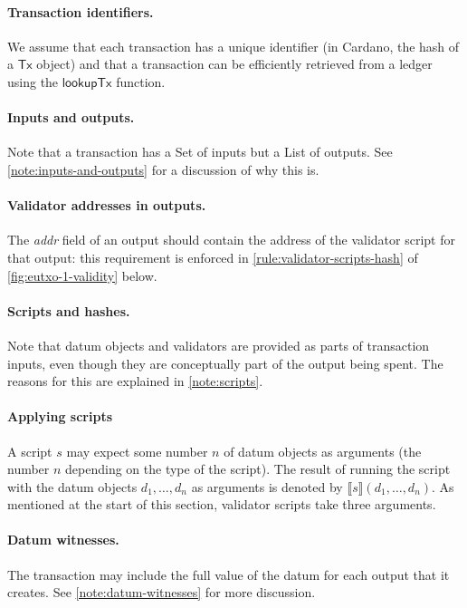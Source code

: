 \documentclass[a4paper]{article}
\newcounter{note}
\newcommand{\msf}[1]{\ensuremath{\mathsf{#1}}}
\newcommand{\lookupTx}{\msf{lookupTx}}
\newcommand{\eutxotx}{\msf{Tx}}
\newcommand{\applyScript}[1]{\ensuremath{\llbracket#1\rrbracket}}
\begin{document}
\paragraph{Transaction identifiers.}  We assume that
each transaction has a unique identifier (in Cardano, the hash of a
$\eutxotx$ object) and that a transaction can be efficiently retrieved
from a ledger using the $\lookupTx$ function.

\paragraph{Inputs and outputs.} Note that a transaction has a
\textsf{Set} of inputs but a \textsf{List} of outputs. See
\cref{note:inputs-and-outputs} for a discussion of why this is.

\paragraph{Validator addresses in outputs.} The \textit{addr} field
of an output should contain the address of the validator script for
that output: this requirement is enforced in
\cref{rule:validator-scripts-hash} of
\cref{fig:eutxo-1-validity} below.

\paragraph{Scripts and hashes.} Note that datum objects and validators are
provided as parts of transaction inputs, even though they are
conceptually part of the output being spent.  The reasons for
this are explained in \cref{note:scripts}.

\paragraph{Applying scripts}  A script $s$ may expect some number $n$
of datum objects as arguments (the number $n$ depending on the type of
the script).  The result of running the script with the datum objects
$d_1,\ldots, d_n$ as arguments is denoted by
$\applyScript{s}(d_1,\ldots,d_n)$.  As mentioned at the start of this
section, validator scripts take three arguments.

\paragraph{Datum witnesses.} The transaction may include the full
value of the datum for each output that it creates.  See
\cref{note:datum-witnesses} for more discussion.
\end{document}

